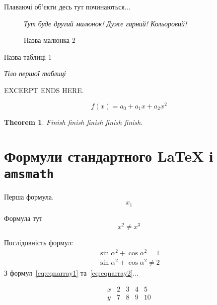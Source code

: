 \documentclass{report}
\theoremstyle{plain}
\newtheorem{theorem}{Theorem}[chapter]
\theoremstyle{remark}
\begin{document}
\begin{yafea}
Плаваючі об'єкти десь тут починаються...

\begin{figure}[htbp]
\emph{Тут буде другий малюнок! Дуже гарний! Кольоровий!}
\caption{Назва малюнка 2}\label{fig:figure2}
\end{figure}

\begin{table}[htbp]
\caption{Назва таблиці 1}\label{tab:table1}
\emph{Тіло першої таблиці}
\end{table}

\end{yafea}

EXCERPT ENDS HERE.\hrulefill

\begin{equation}\label{eq:intro2}
f(x)=a_0+a_1x+a_2x^2
\end{equation}

\begin{theorem}\label{thm:intro2}
Finish finish finish finish finish.
\end{theorem}


\chapter{Формули стандартного \LaTeX{} і \texttt{amsmath}}

Перша формула.
\begin{equation}\label{eq:ch1first}
x_1
\end{equation}

Формула тут
\begin{equation}\label{eq:equation}
x^2 \neq x^3
\end{equation}

Послідовність формул:
\begin{eqnarray}
\label{eq:eqnarray1}
\sin\alpha^2+\cos\alpha^2=1\\
\label{eq:eqnarray2}
\sin\alpha^2+\cos\alpha^2\neq2
\end{eqnarray}
З формул~\eqref{eq:eqnarray1} та~\eqref{eq:eqnarray2}...

\begin{equation}\label{eq:array}
\begin{array}{lllll}
x & 2 & 3 & 4 & 5 \\
y & 7 & 8 & 9 & 10 \\
\end{array}
\end{equation}
\end{document}
